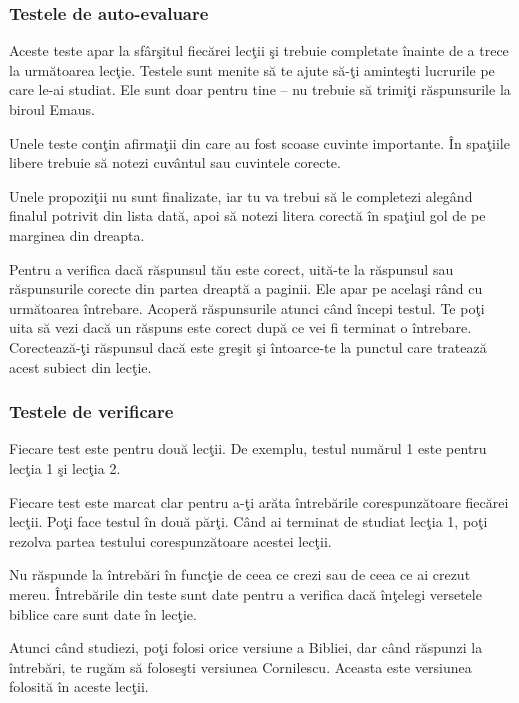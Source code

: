 \subsubsection*{Testele de auto-evaluare}

Aceste teste apar la sfârşitul fiecărei lecţii şi trebuie completate înainte de a trece la următoarea lecţie. Testele sunt menite să te ajute să-ţi aminteşti lucrurile pe care le-ai studiat. Ele sunt doar pentru tine – nu trebuie să trimiţi răspunsurile la biroul Emaus.

Unele teste conţin afirmaţii din care au fost scoase cuvinte importante. În spaţiile libere trebuie să notezi cuvântul sau cuvintele corecte.

Unele propoziţii nu sunt finalizate, iar tu va trebui să le completezi alegând finalul potrivit din lista dată, apoi să notezi litera corectă în spaţiul gol de pe marginea din dreapta.

Pentru a verifica dacă răspunsul tău este corect, uită-te la răspunsul sau răspunsurile corecte din partea dreaptă a paginii. Ele apar pe acelaşi rând cu următoarea întrebare. Acoperă răspunsurile atunci când începi testul. Te poţi uita să vezi dacă un răspuns este corect după ce vei fi terminat o întrebare. Corectează-ţi răspunsul dacă este greşit şi întoarce-te la punctul care tratează acest subiect din lecţie.

\subsubsection*{Testele de verificare}

Fiecare test este pentru două lecţii. De exemplu, testul numărul 1 este pentru lecţia 1 şi lecţia 2.

Fiecare test este marcat clar pentru a-ţi arăta întrebările corespunzătoare fiecărei lecţii. Poţi face testul în două părţi. Când ai terminat de studiat lecţia 1, poţi rezolva partea testului corespunzătoare acestei lecţii.

Nu răspunde la întrebări în funcţie de ceea ce crezi sau de ceea ce ai crezut mereu. Întrebările din teste sunt date pentru a verifica dacă înţelegi versetele biblice care sunt date în lecţie.

Atunci când studiezi, poţi folosi orice versiune a Bibliei, dar când răspunzi la întrebări, te rugăm să foloseşti versiunea Cornilescu. Aceasta este versiunea folosită în aceste lecţii.

